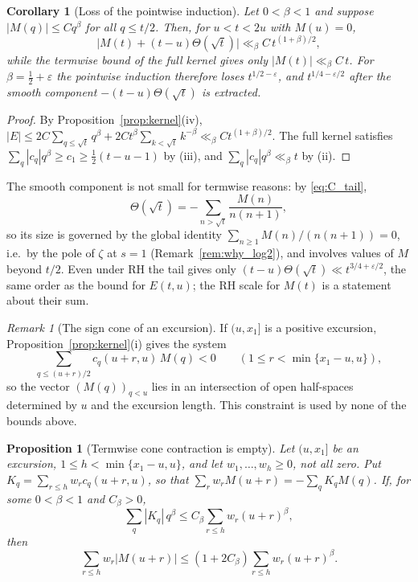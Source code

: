 \documentclass[11pt]{amsart}
\numberwithin{equation}{section}
\theoremstyle{plain}
\newtheorem{proposition}[theorem]{Proposition}
\newtheorem{corollary}[theorem]{Corollary}
\theoremstyle{definition}
\theoremstyle{remark}
\newtheorem{remark}[theorem]{Remark}
\newcommand{\eps}{\varepsilon}
\begin{document}
\begin{corollary}[Loss of the pointwise induction]
\label{cor:induction-loss}
Let $0<\beta<1$ and suppose $|M(q)|\le Cq^\beta$ for all $q\le t/2$. Then,
for $u<t<2u$ with $M(u)=0$,
\begin{equation}
\label{eq:induction-loss}
\bigl|M(t)+(t-u)\Theta(\sqrt t)\bigr|\ll_\beta C\,t^{(1+\beta)/2},
\end{equation}
while the termwise bound of the full kernel gives only
$|M(t)|\ll_\beta C\,t$. For $\beta=\frac12+\eps$ the pointwise induction
therefore loses $t^{1/2-\eps}$, and $t^{1/4-\eps/2}$ after the smooth
component $-(t-u)\Theta(\sqrt t)$ is extracted.
\end{corollary}

\begin{proof}
By Proposition~\ref{prop:kernel}(iv),
$|E|\le2C\sum_{q\le\sqrt t}q^\beta+2Ct^\beta\sum_{k<\sqrt t}k^{-\beta}
\ll_\beta Ct^{(1+\beta)/2}$. The full kernel satisfies
$\sum_q|c_q|q^\beta\ge c_1\ge\frac12(t-u-1)$ by (iii), and
$\sum_q|c_q|q^\beta\ll_\beta t$ by (ii).
\end{proof}

The smooth component is not small for termwise reasons: by
\eqref{eq:C_tail},
\[
\Theta(\sqrt t)=-\sum_{n>\sqrt t}\frac{M(n)}{n(n+1)},
\]
so its size is governed by the global identity
$\sum_{n\ge1}M(n)/(n(n+1))=0$, i.e.\ by the pole of $\zeta$ at $s=1$
(Remark~\ref{rem:why_log2}), and involves values of $M$ beyond $t/2$. Even
under RH the tail gives only $(t-u)\Theta(\sqrt t)\ll t^{3/4+\eps/2}$, the
same order as the bound for $E(t,u)$; the RH scale for $M(t)$ is a statement
about their sum.

\begin{remark}[The sign cone of an excursion]
\label{rem:sign-cone}
If $(u,x_1]$ is a positive excursion, Proposition~\ref{prop:kernel}(i)
gives the system
\[
\sum_{q\le(u+r)/2}c_q(u+r,u)\,M(q)<0\qquad(1\le r<\min\{x_1-u,u\}),
\]
so the vector $(M(q))_{q<u}$ lies in an intersection of open half-spaces
determined by $u$ and the excursion length. This constraint is used by none
of the bounds above.
\end{remark}

\begin{proposition}[Termwise cone contraction is empty]
\label{prop:cone-obstruction}
Let $(u,x_1]$ be an excursion, $1\le h<\min\{x_1-u,u\}$, and let
$w_1,\dots,w_h\ge0$, not all zero. Put
$K_q=\sum_{r\le h}w_rc_q(u+r,u)$, so that
$\sum_rw_rM(u+r)=-\sum_qK_qM(q)$. If, for some $0<\beta<1$ and $C_\beta>0$,
\begin{equation}
\label{eq:cone-contraction}
\sum_q|K_q|\,q^\beta\le C_\beta\sum_{r\le h}w_r(u+r)^\beta,
\end{equation}
then
\[
\sum_{r\le h}w_r|M(u+r)|\le(1+2C_\beta)\sum_{r\le h}w_r(u+r)^\beta .
\]
\end{proposition}
\end{document}

